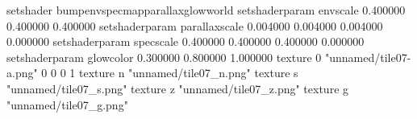 setshader bumpenvspecmapparallaxglowworld
setshaderparam envscale 0.400000 0.400000 0.400000
setshaderparam parallaxscale 0.004000 0.004000 0.004000 0.000000
setshaderparam specscale 0.400000 0.400000 0.400000 0.000000
setshaderparam glowcolor 0.300000 0.800000 1.000000
texture 0 "unnamed/tile07-a.png" 0 0 0 1
texture n "unnamed/tile07_n.png"
texture s "unnamed/tile07_s.png"
texture z "unnamed/tile07_z.png"
texture g "unnamed/tile07_g.png"